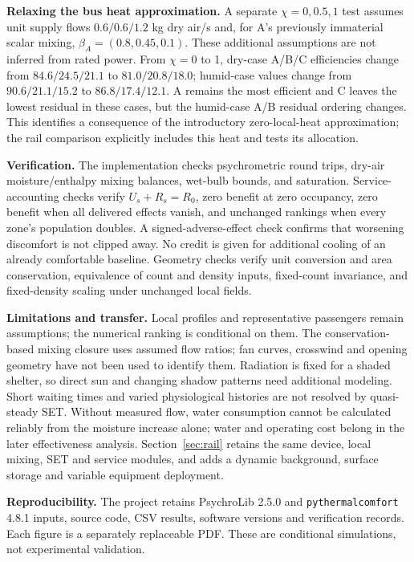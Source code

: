 \documentclass[12pt]{article}
\begin{document}
\noindent\textbf{Relaxing the bus heat approximation.} A separate $\chi=0,0.5,1$ test assumes unit supply flows $0.6/0.6/1.2$ kg dry air/s and, for A's previously immaterial scalar mixing, $\beta_A=(0.8,0.45,0.1)$. These additional assumptions are not inferred from rated power. From $\chi=0$ to 1, dry-case A/B/C efficiencies change from $84.6/24.5/21.1$ to $81.0/20.8/18.0$; humid-case values change from $90.6/21.1/15.2$ to $86.8/17.4/12.1$. A remains the most efficient and C leaves the lowest residual in these cases, but the humid-case A/B residual ordering changes. This identifies a consequence of the introductory zero-local-heat approximation; the rail comparison explicitly includes this heat and tests its allocation.

\noindent\textbf{Verification.} The implementation checks psychrometric round trips, dry-air moisture/enthalpy mixing balances, wet-bulb bounds, and saturation. Service-accounting checks verify $U_s+R_s=R_0$, zero benefit at zero occupancy, zero benefit when all delivered effects vanish, and unchanged rankings when every zone's population doubles. A signed-adverse-effect check confirms that worsening discomfort is not clipped away. No credit is given for additional cooling of an already comfortable baseline. Geometry checks verify unit conversion and area conservation, equivalence of count and density inputs, fixed-count invariance, and fixed-density scaling under unchanged local fields.

\noindent\textbf{Limitations and transfer.} Local profiles and representative passengers remain assumptions; the numerical ranking is conditional on them. The conservation-based mixing closure uses assumed flow ratios; fan curves, crosswind and opening geometry have not been used to identify them. Radiation is fixed for a shaded shelter, so direct sun and changing shadow patterns need additional modeling. Short waiting times and varied physiological histories are not resolved by quasi-steady SET. Without measured flow, water consumption cannot be calculated reliably from the moisture increase alone; water and operating cost belong in the later effectiveness analysis. Section~\ref{sec:rail} retains the same device, local mixing, SET and service modules, and adds a dynamic background, surface storage and variable equipment deployment.

\noindent\textbf{Reproducibility.} The project retains PsychroLib 2.5.0 and \texttt{pythermalcomfort} 4.8.1 inputs, source code, CSV results, software versions and verification records. Each figure is a separately replaceable PDF. These are conditional simulations, not experimental validation.
\end{document}
